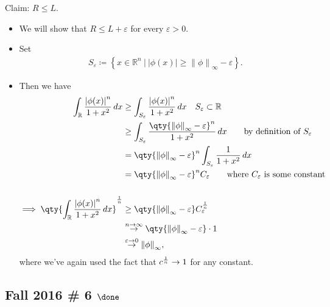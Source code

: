 \begin{solution}
Claim: \(R\leq L\).

\begin{itemize}
\tightlist
\item
  We will show that \(R\leq L + {\varepsilon}\) for every
  \({\varepsilon}>0\).
\item
  Set
  \begin{align*}  
  S_{\varepsilon}\coloneqq\left\{{x\in {\mathbb{R}}^n{~\mathrel{\Big|}~}{\left\lvert {\phi(x)} \right\rvert} \geq {\left\lVert {\phi} \right\rVert}_\infty - {\varepsilon}}\right\}
  .\end{align*}
\item
  Then we have
  \begin{align*}  
  \int_{\mathbb{R}}{{\left\lvert {\phi(x)} \right\rvert}^n \over 1 +x^2}\,dx
  &\geq \int_{S_{\varepsilon}} {{\left\lvert {\phi(x)} \right\rvert}^n \over 1 +x^2}\,dx \quad S_{\varepsilon}\subset {\mathbb{R}}\\
  &\geq \int_{S_{\varepsilon}} { \qty{{\left\lVert {\phi} \right\rVert}_\infty - {\varepsilon}}^n \over 1 +x^2}\,dx  \qquad\text{by definition of }S_{\varepsilon}\\
  &= \qty{{\left\lVert {\phi} \right\rVert}_\infty - {\varepsilon}}^n \int_{S_{\varepsilon}} { 1 \over 1 +x^2}\,dx \\
  &= \qty{{\left\lVert {\phi} \right\rVert}_\infty - {\varepsilon}}^n C_{\varepsilon}\qquad\text{where $C_{\varepsilon}$ is some constant} \\ \\
  \implies 
  \qty{ \int_{\mathbb{R}}{{\left\lvert {\phi(x)} \right\rvert}^n \over 1 +x^2}\,dx }^{1\over n} 
  &\geq \qty{{\left\lVert {\phi} \right\rVert}_\infty - {\varepsilon}} C_{\varepsilon}^{1 \over n} \\
  &\overset{n\to\infty}\to
  \qty{{\left\lVert {\phi} \right\rVert}_\infty - {\varepsilon}} \cdot 1 \\
  &\overset{{\varepsilon}\to 0}\to {\left\lVert {\phi} \right\rVert}_\infty
  ,\end{align*}
  where we've again used the fact that \(c^{1\over n} \to 1\) for any
  constant.
\end{itemize}

\end{solution}

\hypertarget{fall-2016-6-done}{%
\subsection{\texorpdfstring{Fall 2016 \# 6
\(\done\)}{Fall 2016 \# 6 \textbackslash done}}\label{fall-2016-6-done}}

